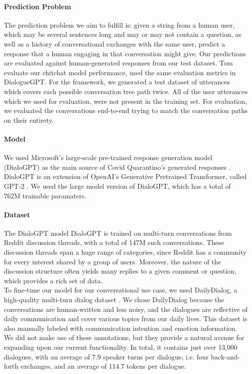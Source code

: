\documentclass[11pt,a4paper]{article}
\begin{document}
\paragraph{Prediction Problem}

The prediction problem we aim to fulfill is: given a string from a human user, which may be several sentences long and may or may not contain a question, as well as a history of conversational exchanges with the same user, predict a response that a human engaging in that conversation might give. Our predictions are evaluated against human-generated responses from our test dataset. Tom evaluate our chitchat model performance, used the same evaluation metrics in DialogueGPT. For the framework, we generated a test dataset of utterances which covers each possible conversation tree path twice. All of the user utterances which we used for evaluation, were not present in the training set. For evaluation, we evaluated the conversations end-to-end trying to match the conversation paths on their entirety.

\paragraph{Model}

We used Microsoft's large-scale pre-trained response generation model (DialoGPT) as the main source of Covid Quarantino's generated responses \cite{zhang2019dialogpt}. DialoGPT is an extension of OpenAI's Generative Pretrained Transformer, called GPT-2 \cite{radford2019language}. We used the large model version of DialoGPT, which has a total of 762M trainable paramaters. %


\paragraph{Dataset} The DialoGPT model DialoGPT is trained on multi-turn conversations from Reddit discussion threads, with a total of 147M such conversations. These discussion threads span a huge range of categories, since Reddit has a community for every interest shared by a group of users. Moreover, the nature of the discussion structure often yields many replies to a given comment or question, which provides a rich set of data. \\
To fine-tune our model for our conversational use case, we used DailyDialog, a high-quality multi-turn dialog dataset \cite{li2017dailydialog}. We chose DailyDialog because the conversations are human-written and less noisy, and the dialogues are reflective of daily communication and cover various topics from our daily lives. This dataset is also manually labeled with communication intention and emotion information. We did not make use of these annotations, but they provide a natural avenue for expanding upon our current functionality. In total, it contains just over 13,000 dialogues, with an average of 7.9 speaker turns per dialogue, i.e. four back-and-forth exchanges, and an average of 114.7 tokens per dialogue. 
\end{document}
